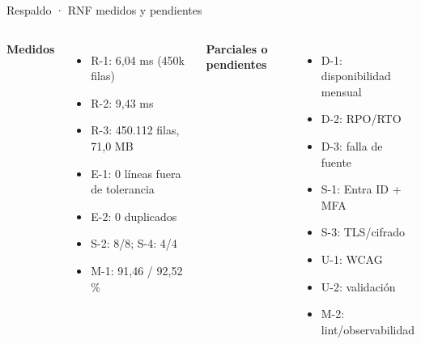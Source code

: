 \documentclass[aspectratio=169,10pt]{beamer}
\begin{document}
\begin{frame}{Respaldo · RNF medidos y pendientes}
  \scriptsize
  \begin{columns}[T,onlytextwidth]
      \textbf{Medidos}
      \begin{itemize}
        \item R-1: 6,04 ms (450k filas)
        \item R-2: 9,43 ms
        \item R-3: 450.112 filas, 71,0 MB
        \item E-1: 0 líneas fuera de tolerancia
        \item E-2: 0 duplicados
        \item S-2: 8/8; S-4: 4/4
        \item M-1: 91,46 / 92,52 \%
      \end{itemize}
      \textbf{Parciales o pendientes}
      \begin{itemize}
        \item D-1: disponibilidad mensual
        \item D-2: RPO/RTO
        \item D-3: falla de fuente
        \item S-1: Entra ID + MFA
        \item S-3: TLS/cifrado
        \item U-1: WCAG
        \item U-2: validación
        \item M-2: lint/observabilidad
      \end{itemize}
  \end{columns}
\end{frame}
\end{document}

